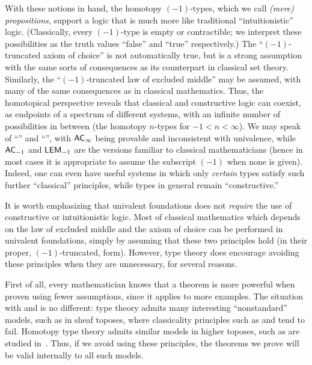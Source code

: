 With these notions in hand, the homotopy $(-1)$-types, which we call \emph{(mere) propositions}, support a logic that is much more like traditional ``intuitionistic'' logic.
(Classically, every $(-1)$-type is empty or contractible; we interpret these possibilities as the truth values ``false'' and ``true'' respectively.)
The ``$(-1)$-truncated axiom of choice'' is not automatically true, but is a strong assumption with the same sorts of consequences as its counterpart in classical set theory.
Similarly, the ``$(-1)$-truncated law of excluded middle'' may be assumed, with many of the same consequences as in classical mathematics.
Thus, the homotopical perspective reveals that classical and constructive logic can coexist, as endpoints of a spectrum of different systems, with an infinite number of possibilities in between (the homotopy $n$-types for $-1 < n < \infty$).
We may speak of ``'' and ``'', with $\mathsf{AC}_{\infty}$ being provable and \LEM{\infty} inconsistent with univalence, while $\mathsf{AC}_{-1}$ and $\mathsf{LEM}_{-1}$ are the versions familiar to classical mathematicians (hence in most cases it is appropriate to assume the subscript $(-1)$ when none is given).  Indeed, one can even have useful systems in which only \emph{certain} types satisfy such further ``classical'' principles, while types in general remain ``constructive.''

It is worth emphasizing that univalent foundations does not \emph{require} the use of constructive or intuitionistic logic.
Most of classical mathematics which depends on the law of excluded middle and the axiom of choice can be performed in univalent foundations, simply by assuming that these two principles hold (in their proper, $(-1)$-truncated, form).
However, type theory does encourage avoiding these principles when they are unnecessary, for several reasons.

First of all, every mathematician knows that a theorem is more powerful when proven using fewer assumptions, since it applies to more examples.
The situation with \choice{} and \LEM{} is no different:
type theory admits many interesting ``nonstandard'' models, such as in sheaf toposes, where classicality principles such as \choice{} and \LEM{} tend to fail.
Homotopy type theory admits similar models in higher toposes, such as are studied in~\cite{ToenVezzosi02,Rezk05,lurie:higher-topoi}.
Thus, if we avoid using these principles, the theorems we prove will be valid internally to all such models.


